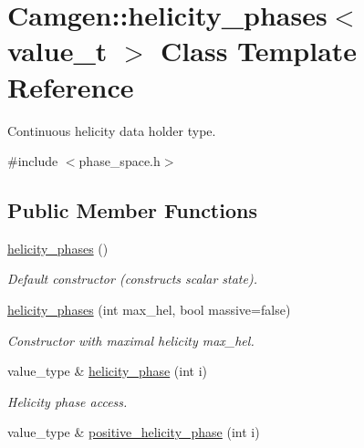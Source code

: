 \hypertarget{a00271}{\section{Camgen\-:\-:helicity\-\_\-phases$<$ value\-\_\-t $>$ Class Template Reference}
\label{a00271}
}


Continuous helicity data holder type.  




{\ttfamily \#include $<$phase\-\_\-space.\-h$>$}

\subsection*{Public Member Functions}
\begin{DoxyCompactItemize}
\item 
\hypertarget{a00271_a5f5f9351481028c0a7062da4e1319234}{\hyperlink{a00271_a5f5f9351481028c0a7062da4e1319234}{helicity\-\_\-phases} ()}\label{a00271_a5f5f9351481028c0a7062da4e1319234}

\begin{DoxyCompactList}\small\item\em Default constructor (constructs scalar state). \end{DoxyCompactList}\item 
\hypertarget{a00271_a9b2e699f79b1e741958ff2a439017c13}{\hyperlink{a00271_a9b2e699f79b1e741958ff2a439017c13}{helicity\-\_\-phases} (int max\-\_\-hel, bool massive=false)}\label{a00271_a9b2e699f79b1e741958ff2a439017c13}

\begin{DoxyCompactList}\small\item\em Constructor with maximal helicity max\-\_\-hel. \end{DoxyCompactList}\item 
\hypertarget{a00271_a06604417c978a0035de8e49af206396e}{value\-\_\-type \& \hyperlink{a00271_a06604417c978a0035de8e49af206396e}{helicity\-\_\-phase} (int i)}\label{a00271_a06604417c978a0035de8e49af206396e}

\begin{DoxyCompactList}\small\item\em Helicity phase access. \end{DoxyCompactList}\item 
\hypertarget{a00271_a45714de482d1835e558d9b66b5edba61}{value\-\_\-type \& \hyperlink{a00271_a45714de482d1835e558d9b66b5edba61}{positive\-\_\-helicity\-\_\-phase} (int i)}\label{a00271_a45714de482d1835e558d9b66b5edba61}


\end{DoxyCompactItemize}

